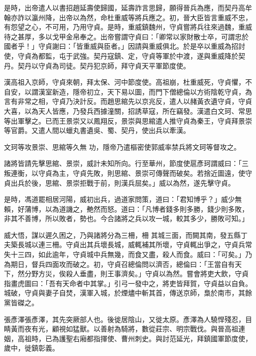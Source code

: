 \begin{pinyinscope}
 是時，出帝遣人以書招趙延壽使歸國，延壽詐言思歸，願得晉兵為應，而契丹高牟翰亦詐以瀛州降，出帝以為然，命杜重威等將兵應之。初，晉大臣皆言重威不忠，有怨望之心，不可用，乃用守貞。是時，重威鎮魏州，守貞嘗將兵往來過魏，重威待之甚厚，多以戈甲金帛奉之。出帝嘗謂守貞曰：「卿常以家財散士卒，可謂忠於國者乎！」守貞謝曰：「皆重威與臣者。」因請與重威俱北。於是卒以重威為招討使，守貞為都監，屯于武強。契丹寇鎮、定，守貞等軍於中渡，遂與重威降於契
 丹。契丹以守貞為司徒。契丹犯京師，拜守貞天平軍節度使。



 漢高祖入京師，守貞來朝，拜太保、河中節度使。高祖崩，杜重威死，守貞懼，不自安，以謂漢室新造，隱帝初立，天下易以圖，而門下僧總倫以方術陰乾守貞，為言有非常之相，守貞乃決計反。而趙思綰先以京兆反，遣人以赭黃衣遺守貞，守貞大喜，以為天人皆應，乃發兵西據潼關，招誘草寇，所在竊發。漢遣白文珂、常思等出軍擊之。已而王景崇又以鳳翔反，景崇與思綰遣人推守貞為秦王，守貞拜景崇等官爵。又遣人間以蠟丸書遺吳、蜀、契丹，使出兵以牽漢。



 文珂等攻景崇、思綰等久無
 功，隱帝乃遣樞密使郭威率禁兵將文珂等督攻之。



 諸將皆請先擊思綰、景崇，威計未知所向。行至華州，節度使扈彥珂謂威曰：「三叛連衡，以守貞為主，守貞先敗，則思綰、景崇可傳聲而破矣。若捨近圖遠，使守貞出兵於後，思綰、景崇拒戰于前，則漢兵屈矣。」威以為然，遂先擊守貞。



 是時，馮道罷相居河陽，威初出兵，過道家問策，道曰：「君知博乎？」威少無賴，好蒲博，以為道譏之，艴然而怒。道曰：「凡博者錢多則多勝，錢少則多敗，非其不善博，所以敗者，勢也。今合諸將之兵以攻一城，較其多少，勝敗可知。」



 威大悟，謀以遲久困之，乃與諸將分為三柵，柵
 其城三面，而闕其南，發五縣丁夫築長城以連三柵。守貞出其兵壞長城，威輒補其所壞，守貞輒出爭之，守貞兵常失十三四，如此逾年，守貞城中兵無幾，而食又盡，殺人而食。威曰：「可矣。」乃為期日，督兵四面攻而破之。初，守貞召總倫問以濟否，總倫曰：「王當自有天下，然分野方災，俟殺人垂盡，則王事濟矣。」守貞以為然。嘗會將吏大飲，守貞指畫虎圖曰：「吾有天命者中其掌。」引弓一發中之，將吏皆拜賀，守貞益以自負。城破，守貞與妻子自焚，漢軍入城，於煙燼中斬其首，傳送京師，梟於南市，其餘黨皆磔之。



 張彥澤張彥澤，其先突厥部人也。後徙居陰山，又徙太原。彥澤為人驍悍殘忍，目睛黃而夜有光，顧視如猛獸。以善射為騎將，數從莊宗、明宗戰伐。與晉高祖連姻，高祖時，已為護聖右廂都指揮使、曹州刺史。與討范延光，拜鎮國軍節度使，歲中，徙鎮彰義。




\end{pinyinscope}
